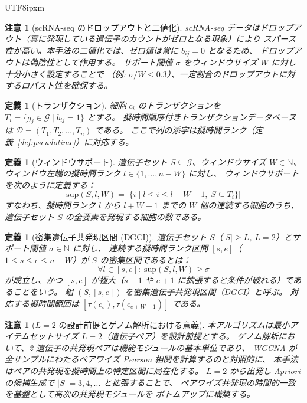 \documentclass[11pt,a4paper]{article}
\newtheorem{definition}[theorem]{定義}
\newtheorem{remark}[theorem]{注意}
\begin{document}
\begin{CJK}{UTF8}{ipxm}
\begin{remark}[scRNA-seq のドロップアウトと二値化]
scRNA-seq データはドロップアウト（真に発現している遺伝子のカウントがゼロとなる現象）により
スパース性が高い。本手法の二値化では、ゼロ値は常に $b_{ij} = 0$ となるため、
ドロップアウトは偽陰性として作用する。
サポート閾値 $\sigma$ をウィンドウサイズ $W$ に対し十分小さく設定することで
（例: $\sigma / W \leq 0.3$）、一定割合のドロップアウトに対するロバスト性を確保する。
\end{remark}

\begin{definition}[トランザクション]
\label{def:transaction}
細胞 $c_i$ のトランザクションを $T_i = \{g_j \in \mathcal{G} \mid b_{ij} = 1\}$ とする。
擬時間順序付きトランザクションデータベースは $\mathcal{D} = (T_1, T_2, \ldots, T_n)$ である。
ここで列の添字は擬時間ランク（定義~\ref{def:pseudotime}）に対応する。
\end{definition}

\begin{definition}[ウィンドウサポート]
\label{def:window-support}
遺伝子セット $S \subseteq \mathcal{G}$、ウィンドウサイズ $W \in \mathbb{N}$、
ウィンドウ左端の擬時間ランク $l \in \{1, \ldots, n - W\}$ に対し、
ウィンドウサポートを次のように定義する：
\begin{equation}
  \mathrm{sup}(S, l, W) = |\{i \mid l \leq i \leq l+W-1,\; S \subseteq T_i\}|
\end{equation}
すなわち、擬時間ランク $l$ から $l+W-1$ までの $W$ 個の連続する細胞のうち、
遺伝子セット $S$ の全要素を発現する細胞の数である。
\end{definition}

\begin{definition}[密集遺伝子共発現区間 (DGCI)]
\label{def:dgci}
遺伝子セット $S$（$|S| \geq L$, $L = 2$）とサポート閾値 $\sigma \in \mathbb{N}$ に対し、
連続する擬時間ランク区間 $[s, e]$（$1 \leq s \leq e \leq n - W$）が
$S$ の密集区間であるとは：
\begin{equation}
  \forall l \in [s, e]:\; \mathrm{sup}(S, l, W) \geq \sigma
\end{equation}
が成立し、かつ $[s,e]$ が極大（$s-1$ や $e+1$ に拡張すると条件が破れる）であることをいう。
組 $(S, [s, e])$ を密集遺伝子共発現区間（DGCI）と呼ぶ。
対応する擬時間範囲は $[\tau(c_s), \tau(c_{e+W-1})]$ である。
\end{definition}

\begin{remark}[$L=2$ の設計前提とゲノム解析における意義]
\label{rem:L2}
本アルゴリズムは最小アイテムセットサイズ $L = 2$（遺伝子ペア）を設計前提とする。
ゲノム解析において、2 遺伝子の共発現ペアは機能モジュールの基本単位であり、
WGCNA が全サンプルにわたるペアワイズ Pearson 相関を計算するのと対照的に、
本手法はペアの共発現を擬時間上の特定区間に局在化する。
$L = 2$ から出発し Apriori の候補生成で $|S| = 3, 4, \ldots$ と拡張することで、
ペアワイズ共発現の時間的一致を基盤として高次の共発現モジュールを
ボトムアップに構築する。
\end{remark}


\end{CJK}
\end{document}
